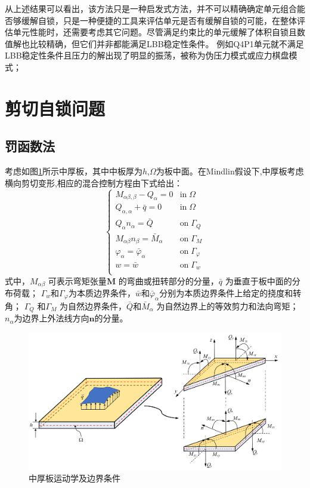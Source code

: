 从上述结果可以看出，该方法只是一种启发式方法，并不可以精确确定单元组合能否够缓解自锁，只是一种便捷的工具来评估单元是否有缓解自锁的可能，在整体评估单元性能时，还需要考虑其它问题。尽管满足约束比的单元缓解了体积自锁且数值解也比较精确，但它们并非都能满足LBB稳定性条件。
例如Q4P1单元就不满足LBB稳定性条件且压力的解出现了明显的振荡，被称为伪压力模式或应力棋盘模式；

\section{剪切自锁问题}      
\subsection{罚函数法}
考虑如图\ref{mindlin_picture}所示中厚板，其中中板厚为$h$,$\Omega$为板中面。在Mindlin假设下,中厚板考虑横向剪切变形,相应的混合控制方程由下式给出：
\begin{equation}\label{strong_mindlin}
    \begin{cases}
        M_{\alpha\beta,\beta} - Q_\alpha = 0 & \textrm{in}\; \Omega \\
        Q_{\alpha,\alpha} + \bar q = 0 & \textrm{in}\; \Omega \\    Q_\alpha n_\alpha = \bar Q & \textrm{on}\; \Gamma_Q \\
        M_{\alpha\beta} n_\beta = \bar M_\alpha & \textrm{on}\; \Gamma_M \\
        \varphi_\alpha = \bar \varphi_\alpha & \textrm{on}\; \Gamma_\varphi \\
        w = \bar w & \textrm{on}\; \Gamma_w \\
    \end{cases}
\end{equation}
式中，$M_{\alpha \beta}$ 可表示弯矩张量$\pmb{M}$ 的弯曲或扭转部分的分量，$\bar{q}$ 为垂直于板中面的分布荷载；
$\Gamma_w$和$\Gamma_\varphi$为本质边界条件，$\bar{w}$和$\bar{\varphi}_\alpha$分别为本质边界条件上给定的挠度和转角；
$\Gamma_Q$ 和$\Gamma_M$ 为自然边界条件，$\bar Q$和$\bar{M}_{\alpha}$ 为自然边界上的等效剪力和法向弯矩；
$n_\alpha$为边界上外法线方向$\pmb{n}$的分量。
\begin{figure}[H]
    \centering 
        \includegraphics[scale=0.5]{figures/shearlocking/Mindlinplate.png}
        \caption{中厚板运动学及边界条件}\label{mindlin_picture}
\end{figure}

